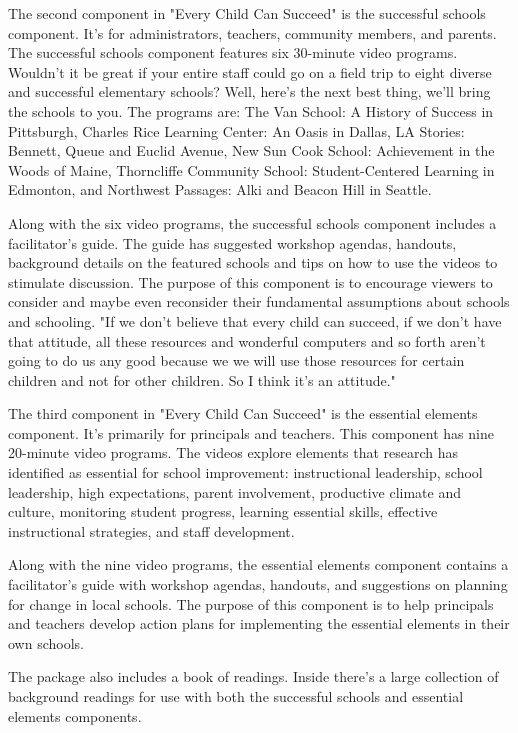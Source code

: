The second component in "Every Child Can Succeed" is the successful schools component.
It's for administrators, teachers, community members, and parents.
The successful schools component features six 30-minute video programs.
Wouldn't it be great if your entire staff could go on a field trip to eight diverse and successful elementary schools? Well, here's the next best thing, we'll bring the schools to you.
The programs are: The Van School: A History of Success in Pittsburgh, Charles Rice Learning Center: An Oasis in Dallas, LA Stories: Bennett, Queue and Euclid Avenue, New Sun Cook School: Achievement in the Woods of Maine, Thorncliffe Community School: Student-Centered Learning in Edmonton, and Northwest Passages: Alki and Beacon Hill in Seattle.

Along with the six video programs, the successful schools component includes a facilitator's guide.
The guide has suggested workshop agendas, handouts, background details on the featured schools and tips on how to use the videos to stimulate discussion.
The purpose of this component is to encourage viewers to consider and maybe even reconsider their fundamental assumptions about schools and schooling.
"If we don't believe that every child can succeed, if we don't have that attitude, all these resources and wonderful computers and so forth aren't going to do us any good because we we will use those resources for certain children and not for other children.
So I think it's an attitude."

The third component in "Every Child Can Succeed" is the essential elements component.
It's primarily for principals and teachers.
This component has nine 20-minute video programs.
The videos explore elements that research has identified as essential for school improvement: instructional leadership, school leadership, high expectations, parent involvement, productive climate and culture, monitoring student progress, learning essential skills, effective instructional strategies, and staff development.

Along with the nine video programs, the essential elements component contains a facilitator's guide with workshop agendas, handouts, and suggestions on planning for change in local schools.
The purpose of this component is to help principals and teachers develop action plans for implementing the essential elements in their own schools.

The package also includes a book of readings.
Inside there's a large collection of background readings for use with both the successful schools and essential elements components.

